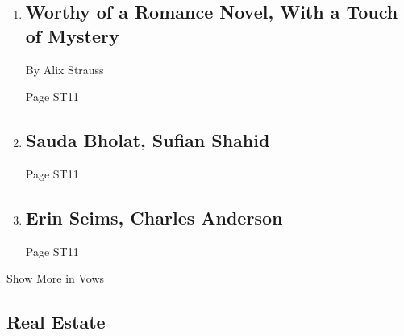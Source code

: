 \begin{enumerate}
\def\labelenumi{\arabic{enumi}.}
\item
  \href{/2018/06/29/fashion/weddings/worthy-of-a-romance-novel-with-a-touch-of-mystery.html}{}

  \hypertarget{worthy-of-a-romance-novel-with-a-touch-of-mystery}{%
  \subsection{Worthy of a Romance Novel, With a Touch of
  Mystery}\label{worthy-of-a-romance-novel-with-a-touch-of-mystery}}

  By Alix Strauss

  Page ST11
\item
  \href{/2018/07/01/fashion/weddings/sauda-bholat-sufian-shahid.html}{}

  \hypertarget{sauda-bholat-sufian-shahid}{%
  \subsection{Sauda Bholat, Sufian
  Shahid}\label{sauda-bholat-sufian-shahid}}

  Page ST11
\item
  \href{/2018/07/01/fashion/weddings/erin-seims-charles-anderson.html}{}

  \hypertarget{erin-seims-charles-anderson}{%
  \subsection{Erin Seims, Charles
  Anderson}\label{erin-seims-charles-anderson}}

  Page ST11
\end{enumerate}

Show More in Vows

\hypertarget{real-estate}{%
\subsection{Real Estate}\label{real-estate}}

